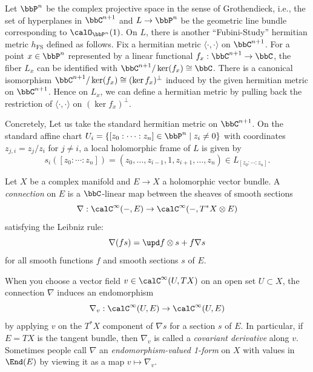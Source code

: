 \begin{example}\label{eg:Fubini-Study_metric_on_O_1}
	Let \(\bbP^n\) be the complex projective space in the sense of Grothendieck, i.e., the set of hyperplanes in \(\bbC^{n+1}\) and \(L \to \bbP^n\) be the geometric line bundle corresponding to \(\calO_{\bbP^n}(1)\).
	On \(L\), there is another ``Fubini-Study'' hermitian metric \(h_{\text{FS}}\) defined as follows.
	Fix a hermitian metric \(\langle \cdot, \cdot \rangle\) on \(\bbC^{n+1}\).
	For a point \(x \in \bbP^n\) represented by a linear functional \(f_x: \bbC^{n+1} \to \bbC\), the fiber \(L_x\) can be identified with \(\bbC^{n+1}/\ker(f_x) \cong \bbC\).
	There is a canonical isomorphism \(\bbC^{n+1}/\ker(f_x) \cong (\ker f_x)^\perp\) induced by the given hermitian metric on \(\bbC^{n+1}\).
	Hence on \(L_x\), we can define a hermitian metric by pulling back the restriction of \(\langle \cdot, \cdot \rangle\) on \((\ker f_x)^\perp\).

	Concretely, Let us take the standard hermitian metric on \(\bbC^{n+1}\).
	On the standard affine chart \(U_i = \{[z_0: \cdots : z_n] \in \bbP^n \mid z_i \neq 0\}\) with coordinates \(z_{j,i} = z_j/z_i\) for \(j \neq i\),
	a local holomorphic frame of \(L\) is given by
	\[s_i([z_0: \cdots : z_n]) = (z_0, \ldots, z_{i-1}, 1, z_{i+1}, \ldots, z_n) \in L_{[z_0: \cdots : z_n]}.\]

\end{example}

\begin{definition}\label{def:connection_on_holomorphic_vector_bundles}
	Let \(X\) be a complex manifold and \(E \to X\) a holomorphic vector bundle.
	A \emph{connection} on \(E\) is a \(\bbC\)-linear map between the sheaves of smooth sections
	\[\nabla: \calC^\infty(-, E) \to \calC^\infty(-, T^*X \otimes E)\]
	satisfying the Leibniz rule:
	\[\nabla(fs) = \upd f \otimes s + f \nabla s\]
	for all smooth functions \(f\) and smooth sections \(s\) of \(E\).
\end{definition}

When you choose a vector field \(v \in \calC^\infty(U, TX)\) on an open set \(U \subset X\), the connection \(\nabla\) induces an endomorphism
\[\nabla_v: \calC^\infty(U, E) \to \calC^\infty(U, E)\]
by applying \(v\) on the \(T^*X\) component of \(\nabla s\) for a section \(s\) of \(E\).
In particular, if \(E = TX\) is the tangent bundle, then \(\nabla_v\) is called a \emph{covariant derivative} along \(v\).
Sometimes people call \(\nabla\) an \emph{endomorphism-valued 1-form} on \(X\) with values in \(\End(E)\) by viewing it as a map \(v \mapsto \nabla_v\).

